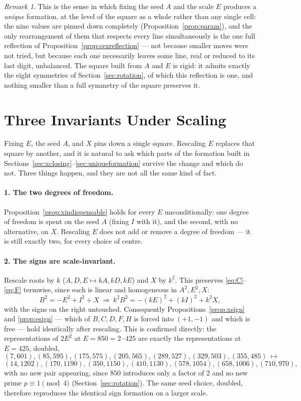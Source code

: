 \documentclass[12pt]{article}
\theoremstyle{remark}
\newtheorem{remark}[theorem]{Remark}
\begin{document}
\begin{remark}
This is the sense in which fixing the seed $A$ and the scale $E$
produces a \emph{unique} formation, at the level of the square as a
whole rather than any single cell: the nine values are pinned down
completely (Proposition~\ref{prop:param}), and the only rearrangement
of them that respects every line simultaneously is the one full
reflection of Proposition~\ref{prop:cexreflection} --- not because
smaller moves were not tried, but because each one necessarily leaves
some line, real or reduced to its last digit, unbalanced. The square
built from $A$ and $E$ is rigid: it admits exactly the eight symmetries
of Section~\ref{sec:rotation}, of which this reflection is one, and
nothing smaller than a full symmetry of the square preserves it.
\end{remark}

\section{Three Invariants Under Scaling}\label{sec:scaleinvariants}

Fixing $E$, the seed $A$, and $X$ pins down a single square. Rescaling
$E$ replaces that square by another, and it is natural to ask which
parts of the formation built in
Sections~\ref{sec:xclosing}--\ref{sec:uniqueformation} survive
the change and which do not. Three things happen, and they are not
all the same kind of fact.

\paragraph{1. The two degrees of freedom.}
Proposition~\ref{prop:xindispensable} holds for every $E$
unconditionally: one degree of freedom is spent on the seed $A$
(fixing $I$ with it), and the second, with no alternative, on $X$.
Rescaling $E$ does not add or remove a degree of freedom --- it is
still exactly two, for every choice of centre.

\paragraph{2. The signs are scale-invariant.}
Rescale roots by $k$ ($A,D,E\mapsto kA,kD,kE$) and $X$ by $k^2$. This
preserves \eqref{eq:C}--\eqref{eq:F} termwise, since each is linear
and homogeneous in $A^2,E^2,X$:
\[
B^2=-E^2+I^2+X \ \Longrightarrow\ k^2B^2=-(kE)^2+(kI)^2+k^2X ,
\]
with the signs on the right untouched. Consequently
Propositions~\ref{prop:xsign} and \ref{prop:esign} --- which of
$B,C,D,F,H$ is forced into $(+1,-1)$ and which is free --- hold
identically after rescaling. This is confirmed directly: the
representations of $2E^2$ at $E=850=2\cdot425$ are exactly the
representations at $E=425$, doubled,
\[
(7,601),(85,595),(175,575),(205,565),(289,527),(329,503),(355,485)
\ \longmapsto\
\]
\[
(14,1202),(170,1190),(350,1150),(410,1130),(578,1054),(658,1006),(710,970) ,
\]
with no new pair appearing, since $850$ introduces only a factor of
$2$ and no new prime $p\equiv1\pmod4$ (Section~\ref{sec:rotation}).
The same seed choice, doubled, therefore reproduces the identical sign
formation on a larger scale.
\end{document}
